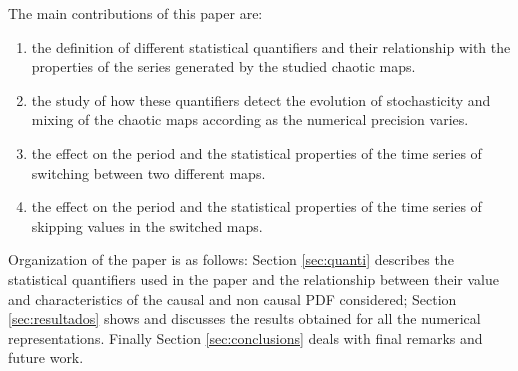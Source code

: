 The main contributions of this paper are:
\begin{enumerate}
\item the definition of different statistical quantifiers and their relationship with the properties of the series generated by the studied chaotic maps.
\item the study of how these quantifiers detect the evolution of stochasticity and mixing of the chaotic maps according as the numerical precision varies.
\item the effect on the period and the statistical properties of the time series of switching between two different maps.
\item the effect on the period and the statistical properties of the time series of skipping values in the switched maps.
\end{enumerate}

Organization of the paper is as follows:
Section \ref{sec:quanti} describes the statistical quantifiers used in the paper and the relationship between their value and characteristics of the causal and non causal PDF considered;
Section \ref{sec:resultados} shows and discusses the results obtained for all the numerical representations.
Finally Section \ref{sec:conclusions} deals with final remarks and future work.